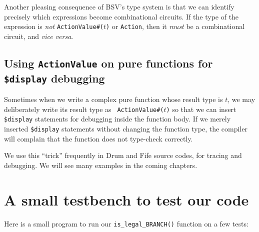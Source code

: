 
Another pleasing consequence of BSV's type system is that we can
identify precisely which expressions become combinational circuits.
If the type of the expression is \emph{not} {\tt ActionValue\#($t$)}
or {\tt Action}, then it \emph{must} be a combinational circuit, and
\emph{vice versa}.


\subsection{Using {\tt ActionValue} on pure functions for {\tt \$display} debugging}

Sometimes when we write a complex pure function whose result type is
$t$, we may deliberately write its result type as {\tt
ActionValue\#($t$)} so that we can insert \verb|$display| statements
for debugging inside the function body.  If we merely inserted
\verb|$display| statements without changing the function type, the
compiler will complain that the function does not type-check
correctly.

We use this ``trick'' frequently in Drum and Fife source codes, for
tracing and debugging.  We will see many examples in the coming
chapters.


\section{A small testbench to test our code}

\label{BSV_small_testbench}


Here is a small program to run our \verb|is_legal_BRANCH()| function on
a few tests:

